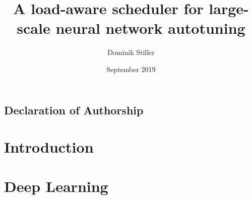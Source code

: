\title{A load-aware scheduler for large-scale neural network autotuning}
\author{Dominik Stiller}
\date{September 2019}



\makeglossaries




	\pagestyle{empty}
	\makeatletter
	\begin{titlepage}
		
	\end{titlepage}
	
	\section*{Declaration of Authorship}
	
	\makeatother

	\begin{abstract}
		
	\end{abstract}

	\setlength{\cftbeforetoctitleskip}{0em}
	\begin{spacing}{1.15}
	   \tableofcontents
	\end{spacing}
	\clearpage
	\thispagestyle{empty}
	
	\pagestyle{plain}
	
	\printacronyms
	\clearpage
	
	\listoffigures
	\clearpage
	\listoftables
	\renewcommand\listoflistingscaption{List of Source Codes}
	\listoflistings
	\clearpage
	
	
	\pagestyle{headings}
	
	
	\chapter{Introduction}
	
	\chapter{Deep Learning}
	
